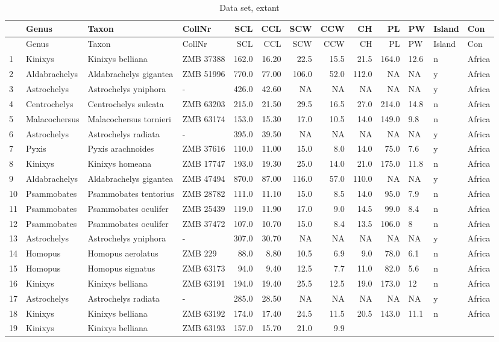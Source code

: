 \documentclass[]{article}
\begin{document}
\begin{longtable}[]{@{}llllrrrrrrlll@{}}
\caption{Data set, extant}\tabularnewline
\toprule
& Genus & Taxon & CollNr & SCL & CCL & SCW & CCW & CH & PL & PW & Island
& Con\tabularnewline
\midrule
\endfirsthead
\toprule
& Genus & Taxon & CollNr & SCL & CCL & SCW & CCW & CH & PL & PW & Island
& Con\tabularnewline
\midrule
\endhead
1 & Kinixys & Kinixys belliana & ZMB 37388 & 162.0 & 16.20 & 22.5 & 15.5
& 21.5 & 164.0 & 12.6 & n & Africa\tabularnewline
2 & Aldabrachelys & Aldabrachelys gigantea & ZMB 51996 & 770.0 & 77.00 &
106.0 & 52.0 & 112.0 & NA & NA & y & Africa\tabularnewline
3 & Astrochelys & Astrochelys yniphora & - & 426.0 & 42.60 & NA & NA &
NA & NA & NA & y & Africa\tabularnewline
4 & Centrochelys & Centrochelys sulcata & ZMB 63203 & 215.0 & 21.50 &
29.5 & 16.5 & 27.0 & 214.0 & 14.8 & n & Africa\tabularnewline
5 & Malacochersus & Malacochersus tornieri & ZMB 63174 & 153.0 & 15.30 &
17.0 & 10.5 & 14.0 & 149.0 & 9.8 & n & Africa\tabularnewline
6 & Astrochelys & Astrochelys radiata & - & 395.0 & 39.50 & NA & NA & NA
& NA & NA & y & Africa\tabularnewline
7 & Pyxis & Pyxis arachnoides & ZMB 37616 & 110.0 & 11.00 & 15.0 & 8.0 &
14.0 & 75.0 & 7.6 & y & Africa\tabularnewline
8 & Kinixys & Kinixys homeana & ZMB 17747 & 193.0 & 19.30 & 25.0 & 14.0
& 21.0 & 175.0 & 11.8 & n & Africa\tabularnewline
9 & Aldabrachelys & Aldabrachelys gigantea & ZMB 47494 & 870.0 & 87.00 &
116.0 & 57.0 & 110.0 & NA & NA & y & Africa\tabularnewline
10 & Psammobates & Psammobates tentorius & ZMB 28782 & 111.0 & 11.10 &
15.0 & 8.5 & 14.0 & 95.0 & 7.9 & n & Africa\tabularnewline
11 & Psammobates & Psammobates oculifer & ZMB 25439 & 119.0 & 11.90 &
17.0 & 9.0 & 14.5 & 99.0 & 8.4 & n & Africa\tabularnewline
12 & Psammobates & Psammobates oculifer & ZMB 37472 & 107.0 & 10.70 &
15.0 & 8.4 & 13.5 & 106.0 & 8 & n & Africa\tabularnewline
13 & Astrochelys & Astrochelys yniphora & - & 307.0 & 30.70 & NA & NA &
NA & NA & NA & y & Africa\tabularnewline
14 & Homopus & Homopus aerolatus & ZMB 229 & 88.0 & 8.80 & 10.5 & 6.9 &
9.0 & 78.0 & 6.1 & n & Africa\tabularnewline
15 & Homopus & Homopus signatus & ZMB 63173 & 94.0 & 9.40 & 12.5 & 7.7 &
11.0 & 82.0 & 5.6 & n & Africa\tabularnewline
16 & Kinixys & Kinixys belliana & ZMB 63191 & 194.0 & 19.40 & 25.5 &
12.5 & 19.0 & 173.0 & 12 & n & Africa\tabularnewline
17 & Astrochelys & Astrochelys radiata & - & 285.0 & 28.50 & NA & NA &
NA & NA & NA & y & Africa\tabularnewline
18 & Kinixys & Kinixys belliana & ZMB 63192 & 174.0 & 17.40 & 24.5 &
11.5 & 20.5 & 143.0 & 11.1 & n & Africa\tabularnewline
19 & Kinixys & Kinixys belliana & ZMB 63193 & 157.0 & 15.70 & 21.0 & 9.9

\end{longtable}
\end{document}
